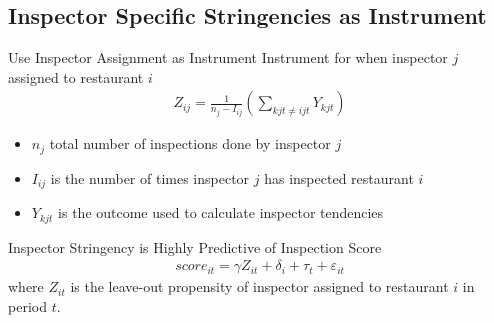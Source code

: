 \documentclass{beamer}
\begin{document}
\subsection{Inspector Specific Stringencies as Instrument}
\begin{frame}{Use Inspector Assignment as Instrument}
Instrument for when inspector $j$ assigned to restaurant $i$
    \begin{align*}
        Z_{ij} = \frac{1}{n_j - I_{ij}} \left( \sum_{kjt\neq ijt}   Y_{kjt}\right)
    \end{align*}
    \begin{itemize}
    \item $n_j$ total number of inspections done by inspector $j$
    \item $I_{ij}$ is the number of times inspector $j$ has inspected restaurant $i$
    \item $Y_{kjt}$ is the outcome used to calculate inspector tendencies
    \end{itemize}
\end{frame}

\begin{frame}{Inspector Stringency is Highly Predictive of Inspection Score}
\begin{align*}
    score_{it} = \gamma Z_{it} + \delta_i + \tau_t + \varepsilon_{it}
\end{align*}
\footnotesize{where $Z_{it}$ is the leave-out propensity of inspector assigned to restaurant $i$ in period $t$.}
\begin{table}[h!]
\centering
\scalebox{0.8}{ }
\label{first_stage_reg}
\end{table}
\end{frame}
\end{document}
